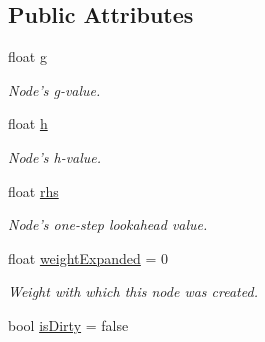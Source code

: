 \subsection*{Public Attributes}
\begin{DoxyCompactItemize}
\item 
\hypertarget{class_a_r_astar_node_ad8d5a3ba74c94fe21aafeb8b964c8a94}{float \hyperlink{class_a_r_astar_node_ad8d5a3ba74c94fe21aafeb8b964c8a94}{g}}\label{class_a_r_astar_node_ad8d5a3ba74c94fe21aafeb8b964c8a94}

\begin{DoxyCompactList}\small\item\em Node's g-\/value. \end{DoxyCompactList}\item 
\hypertarget{class_a_r_astar_node_aa9bc1b92b44c724c0b2c366fa9a37088}{float \hyperlink{class_a_r_astar_node_aa9bc1b92b44c724c0b2c366fa9a37088}{h}}\label{class_a_r_astar_node_aa9bc1b92b44c724c0b2c366fa9a37088}

\begin{DoxyCompactList}\small\item\em Node's h-\/value. \end{DoxyCompactList}\item 
\hypertarget{class_a_r_astar_node_a468f25ef194017b3c14eba82d6d35158}{float \hyperlink{class_a_r_astar_node_a468f25ef194017b3c14eba82d6d35158}{rhs}}\label{class_a_r_astar_node_a468f25ef194017b3c14eba82d6d35158}

\begin{DoxyCompactList}\small\item\em Node's one-\/step lookahead value. \end{DoxyCompactList}\item 
\hypertarget{class_a_r_astar_node_a653e0d399e1e9a7f4f970bb87fcaf257}{float \hyperlink{class_a_r_astar_node_a653e0d399e1e9a7f4f970bb87fcaf257}{weight\-Expanded} = 0}\label{class_a_r_astar_node_a653e0d399e1e9a7f4f970bb87fcaf257}

\begin{DoxyCompactList}\small\item\em Weight with which this node was created. \end{DoxyCompactList}\item 
\hypertarget{class_a_r_astar_node_ad3d169703b521311929565674575bf0d}{bool \hyperlink{class_a_r_astar_node_ad3d169703b521311929565674575bf0d}{is\-Dirty} = false}\label{class_a_r_astar_node_ad3d169703b521311929565674575bf0d}


\end{DoxyCompactItemize}
